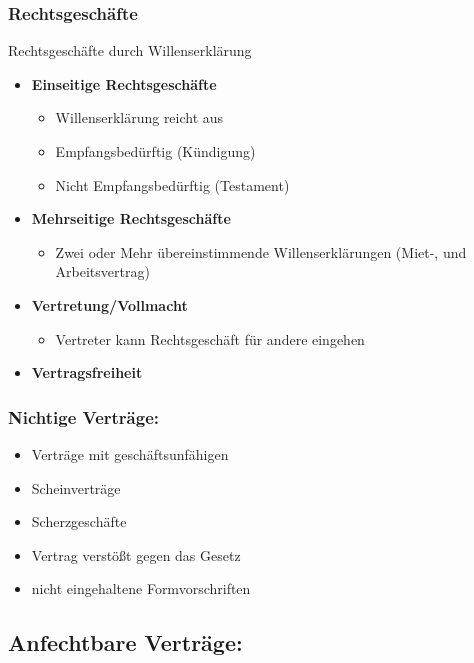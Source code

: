 \subsubsection{Rechtsgeschäfte}

Rechtsgeschäfte durch Willenserklärung

\begin{itemize}
	\item \textbf{Einseitige Rechtsgeschäfte}
	\begin{itemize}
		\item Willenserklärung reicht aus
		\item Empfangsbedürftig (Kündigung)
		\item Nicht Empfangsbedürftig (Testament)
	\end{itemize}
	\item \textbf{Mehrseitige Rechtsgeschäfte}
	\begin{itemize}
		\item Zwei oder Mehr übereinstimmende Willenserklärungen (Miet-, und Arbeitsvertrag)
	\end{itemize}
	\item \textbf{Vertretung/Vollmacht}
	\begin{itemize}
		\item Vertreter kann Rechtsgeschäft für andere eingehen
	\end{itemize}
	\item \textbf{Vertragsfreiheit}
\end{itemize}
	
\subsubsection{Nichtige Verträge:}

\begin{itemize}
	\item Verträge mit geschäftsunfähigen 
	\item Scheinverträge
	\item Scherzgeschäfte
	\item Vertrag verstößt gegen das Gesetz
	\item nicht eingehaltene Formvorschriften
\end{itemize}
	
\subsection{Anfechtbare Verträge:}

